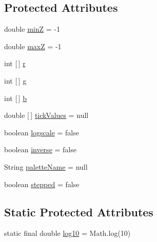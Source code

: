 \subsection*{Protected Attributes}
\begin{DoxyCompactItemize}
\item 
double \mbox{\hyperlink{classorg_1_1jfree_1_1chart_1_1plot_1_1_color_palette_a4a4456c8c35b974596437e3a334a0269}{minZ}} = -\/1
\item 
double \mbox{\hyperlink{classorg_1_1jfree_1_1chart_1_1plot_1_1_color_palette_a9d96382373fa58bc47a56ea3ca0b6338}{maxZ}} = -\/1
\item 
int \mbox{[}$\,$\mbox{]} \mbox{\hyperlink{classorg_1_1jfree_1_1chart_1_1plot_1_1_color_palette_a348501e650a9f9f94c8a5ecf5aa0e82c}{r}}
\item 
int \mbox{[}$\,$\mbox{]} \mbox{\hyperlink{classorg_1_1jfree_1_1chart_1_1plot_1_1_color_palette_a6d534e6343f82ca8ada4bcf141a3e9d9}{g}}
\item 
int \mbox{[}$\,$\mbox{]} \mbox{\hyperlink{classorg_1_1jfree_1_1chart_1_1plot_1_1_color_palette_a2f22c8e598dcd5e4d3e4d9bf39342a24}{b}}
\item 
double \mbox{[}$\,$\mbox{]} \mbox{\hyperlink{classorg_1_1jfree_1_1chart_1_1plot_1_1_color_palette_a3adb52363e9c1200b406599ad700f1c0}{tick\+Values}} = null
\item 
boolean \mbox{\hyperlink{classorg_1_1jfree_1_1chart_1_1plot_1_1_color_palette_a58ad492cf420f27bd91f50de3971c2b3}{logscale}} = false
\item 
boolean \mbox{\hyperlink{classorg_1_1jfree_1_1chart_1_1plot_1_1_color_palette_a3de729d7241de088dcd7d10fe6791152}{inverse}} = false
\item 
String \mbox{\hyperlink{classorg_1_1jfree_1_1chart_1_1plot_1_1_color_palette_a8cffba3a85931f06bbeb75360fdd8d5a}{palette\+Name}} = null
\item 
boolean \mbox{\hyperlink{classorg_1_1jfree_1_1chart_1_1plot_1_1_color_palette_a5a0ce2a263308e7c22087c382a2100d5}{stepped}} = false
\end{DoxyCompactItemize}
\subsection*{Static Protected Attributes}
\begin{DoxyCompactItemize}
\item 
static final double \mbox{\hyperlink{classorg_1_1jfree_1_1chart_1_1plot_1_1_color_palette_a1d281884b2bdf0daa07e4cb182908516}{log10}} = Math.\+log(10)
\end{DoxyCompactItemize}


